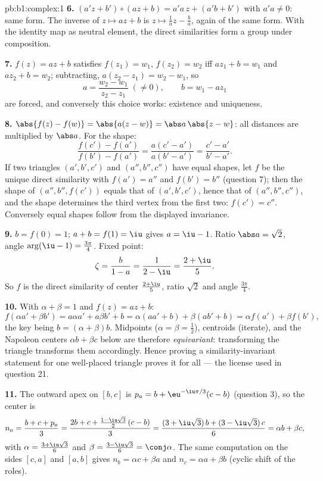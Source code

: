 \begin{solution}{pb:b1:complex:1}
\textbf{6.} $(a'z + b') \circ (az + b) = a'a\,z + (a'b + b')$ with
$a'a \neq 0$: same form. The inverse of $z \mapsto az + b$ is $z
\mapsto \frac1a z - \frac ba$, again of the same form. With the
identity map as neutral element, the direct similarities form a
group under composition.

\textbf{7.} $f(z) = az + b$ satisfies $f(z_1) = w_1$, $f(z_2) =
w_2$ iff $a z_1 + b = w_1$ and $a z_2 + b = w_2$; subtracting,
$a(z_2 - z_1) = w_2 - w_1$, so
\[
a = \frac{w_2 - w_1}{z_2 - z_1} \;(\neq 0), \qquad
b = w_1 - a z_1
\]
are forced, and conversely this choice works: existence and
uniqueness.

\textbf{8.} $\abs{f(z) - f(w)} = \abs{a(z - w)} = \abs a\,\abs{z -
w}$: all distances are multiplied by $\abs a$. For the shape:
\[
\frac{f(c') - f(a')}{f(b') - f(a')} = \frac{a(c' -
a')}{a(b' - a')} = \frac{c' - a'}{b' - a'} .
\]
If two triangles $(a', b', c')$ and $(a'', b'', c'')$ have equal
shapes, let $f$ be the unique direct similarity with $f(a') = a''$
and $f(b') = b''$ (question 7); then the shape of $(a'', b'',
f(c'))$ equals that of $(a', b', c')$, hence that of $(a'', b'',
c'')$, and the shape determines the third vertex from the first
two: $f(c') = c''$. Conversely equal shapes follow from the
displayed invariance.

\textbf{9.} $b = f(0) = 1$; $a + b = f(1) = \iu$ gives $a = \iu -
1$. Ratio $\abs a = \sqrt2$, angle $\arg(\iu - 1) =
\frac{3\pi}4$. Fixed point:
\[
\zeta = \frac{b}{1 - a} = \frac1{2 - \iu} = \frac{2 + \iu}5 .
\]
So $f$ is the direct similarity of center $\frac{2+\iu}5$, ratio
$\sqrt2$ and angle $\frac{3\pi}4$.

\textbf{10.} With $\alpha + \beta = 1$ and $f(z) = az + b$:
\[
f(\alpha a' + \beta b') = a\alpha a' + a\beta b' + b
= \alpha(a a' + b) + \beta(a b' + b)
= \alpha f(a') + \beta f(b') ,
\]
the key being $b = (\alpha + \beta)b$. Midpoints ($\alpha = \beta =
\frac12$), centroids (iterate), and the Napoleon centers $\alpha b
+ \beta c$ below are therefore \emph{equivariant}: transforming the
triangle transforms them accordingly. Hence proving a
similarity-invariant statement for one well-placed triangle proves
it for all --- the license used in question 21.

\textbf{11.} The outward apex on $[b, c]$ is $p_a = b +
\eu^{-\iu\pi/3}(c - b)$ (question 3), so the center is
\[
n_a = \frac{b + c + p_a}3
= \frac{2b + c + \frac{1 - \iu\sqrt3}2\,(c - b)}3
= \frac{(3 + \iu\sqrt3)\,b + (3 - \iu\sqrt3)\,c}6
= \alpha b + \beta c ,
\]
with $\alpha = \frac{3 + \iu\sqrt3}6$ and $\beta = \frac{3 -
\iu\sqrt3}6 = \conj\alpha$. The same computation on the sides
$[c, a]$ and $[a, b]$ gives $n_b = \alpha c + \beta a$ and $n_c =
\alpha a + \beta b$ (cyclic shift of the roles).


\end{solution}
